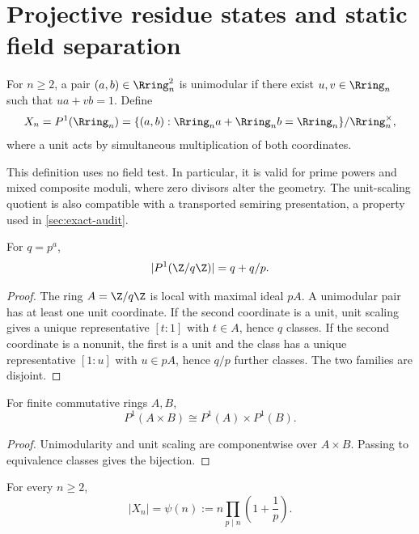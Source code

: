 \section{Projective residue states and static field separation}
\label{sec:projective}

\begin{definition}
For $n\ge2$, a pair $(a,b)\in\Rring_n^2$ is unimodular if there exist
$u,v\in\Rring_n$ such that $ua+vb=1$.  Define
\[
 X_n=P^1(\Rring_n)
 =\{(a,b):\Rring_na+\Rring_nb=\Rring_n\}/\Rring_n^\times,
\]
where a unit acts by simultaneous multiplication of both coordinates.
\end{definition}

This definition uses no field test.  In particular, it is valid for prime
powers and mixed composite moduli, where zero divisors alter the geometry.
The unit-scaling quotient is also compatible with a transported semiring
presentation, a property used in \cref{sec:exact-audit}.

\begin{lemma}
\label{lem:prime-power-count}
For $q=p^a$,
\[
 |P^1(\Z/q\Z)|=q+q/p.
\]
\end{lemma}

\begin{proof}
The ring $A=\Z/q\Z$ is local with maximal ideal $pA$.  A unimodular pair has
at least one unit coordinate.  If the second coordinate is a unit, unit
scaling gives a unique representative $[t:1]$ with $t\in A$, hence $q$
classes.  If the second coordinate is a nonunit, the first is a unit and the
class has a unique representative $[1:u]$ with $u\in pA$, hence $q/p$
further classes.  The two families are disjoint.
\end{proof}

\begin{lemma}
\label{lem:product-projective}
For finite commutative rings $A,B$,
\[
 P^1(A\times B)\cong P^1(A)\times P^1(B).
\]
\end{lemma}

\begin{proof}
Unimodularity and unit scaling are componentwise over $A\times B$.
Passing to equivalence classes gives the bijection.
\end{proof}

\begin{theorem}
\label{thm:projective-count}
For every $n\ge2$,
\[
 |X_n|=\psi(n):=n\prod_{p\mid n}\left(1+\frac1p\right).
\]
\end{theorem}


